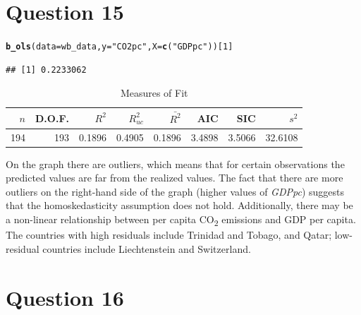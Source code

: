 \documentclass[english, 11pt]{article}\usepackage[]{graphicx}\usepackage[]{color}
\makeatletter
\newcommand{\hlnum}[1]{\textcolor[rgb]{0.686,0.059,0.569}{#1}}%
\newcommand{\hlstr}[1]{\textcolor[rgb]{0.192,0.494,0.8}{#1}}%
\newcommand{\hlstd}[1]{\textcolor[rgb]{0.345,0.345,0.345}{#1}}%
\newcommand{\hlkwc}[1]{\textcolor[rgb]{0.333,0.667,0.333}{#1}}%
\newcommand{\hlkwd}[1]{\textcolor[rgb]{0.737,0.353,0.396}{\textbf{#1}}}%
\newenvironment{kframe}{%
 \def\at@end@of@kframe{}%
 \ifinner\ifhmode%
  \def\at@end@of@kframe{\end{minipage}}%
  \begin{minipage}{\columnwidth}%
 \fi\fi%
 \def\FrameCommand##1{\hskip\@totalleftmargin \hskip-\fboxsep
 \colorbox{shadecolor}{##1}\hskip-\fboxsep
     \hskip-\linewidth \hskip-\@totalleftmargin \hskip\columnwidth}%
 \MakeFramed {\advance\hsize-\width
   \@totalleftmargin\z@ \linewidth\hsize
   \@setminipage}}%
 {\par\unskip\endMakeFramed%
 \at@end@of@kframe}
\newenvironment{knitrout}{}{} %
\makeatother
\begin{document}
\newpage
\noindent \section*{Question 15}   


\begin{knitrout}\small
{}\color{fgcolor}\begin{kframe}
\begin{alltt}
\hlkwd{b_ols}\hlstd{(}\hlkwc{data} \hlstd{= wb_data,} \hlkwc{y}\hlstd{=}\hlstr{"CO2pc"}\hlstd{,} \hlkwc{X}\hlstd{=}\hlkwd{c}\hlstd{(}\hlstr{"GDPpc"}\hlstd{))[}\hlnum{1}\hlstd{]}
\end{alltt}
\begin{verbatim}
## [1] 0.2233062
\end{verbatim}
\end{kframe}
\end{knitrout}

\begin{knitrout}
\color{fgcolor}\begin{table}[!h]

\caption{\label{tab:Q.15 table}Measures of Fit}
\centering
\begin{tabular}[t]{rrrrrrrr}
\toprule
$n$ & D.O.F. & $R^2$ & $R^2_{uc}$ & $\bar{R^2}$ & AIC & SIC & $s^2$\\
\midrule
194 & 193 & 0.1896 & 0.4905 & 0.1896 & 3.4898 & 3.5066 & 32.6108\\
\bottomrule
\end{tabular}
\end{table}


\end{knitrout}


\noindent On the graph there are outliers, which means that for certain observations the predicted values are far from the realized values. The fact that there are more outliers on the right-hand side of the graph (higher values of \textit{GDPpc}) suggests that the homoskedasticity assumption does not hold. Additionally, there may be a non-linear relationship between per capita CO\textsubscript{2} emissions and GDP per capita. 
\\
\smallskip
\noindent The countries with high residuals include Trinidad and Tobago, and Qatar; low-residual countries include Liechtenstein and Switzerland.


\noindent \section*{Question 16}
\end{document}
